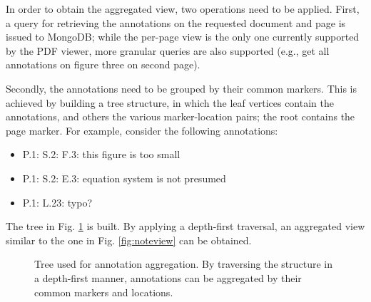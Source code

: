 In order to obtain the aggregated view, two operations need to be applied.
First, a query for retrieving the annotations on the requested document and
page is issued to MongoDB; while the per-page view is the only one currently
supported by the PDF viewer, more granular queries are also supported (e.g., get
all annotations on figure three on second page).

Secondly, the annotations need to be grouped by their common markers. This is
achieved by building a tree structure, in which the leaf vertices contain the
annotations, and others the various marker-location pairs; the root contains
the page marker. For example, consider the following annotations:
\begin{itemize}
    \item P.1: S.2: F.3: this figure is too small
    \item P.1: S.2: E.3: equation system is not presumed
    \item P.1: L.23: typo?
\end{itemize}
The tree in Fig. \ref{fig:tree} is built. By applying a depth-first traversal,
an aggregated view similar to the one in Fig. \ref{fig:noteview} can be
obtained.

\begin{figure}[!ht]
  \centering
  \caption[Tree used for annotation aggregation.]
          {Tree used for annotation aggregation. By traversing the structure in
           a  depth-first manner, annotations can be aggregated by their common
           markers and locations.}
  \label{fig:tree}
\end{figure}
